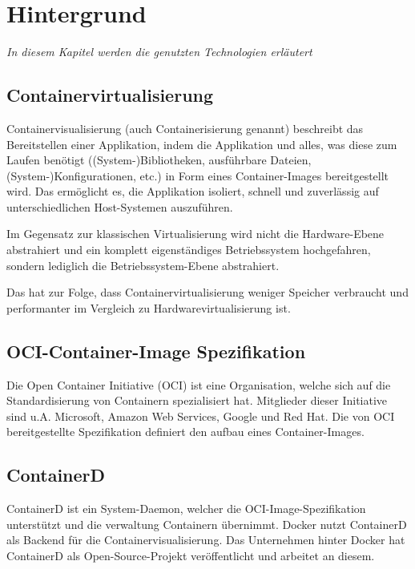 \chapter{Hintergrund}

\label{cha:background}
\textit{In diesem Kapitel werden die genutzten Technologien erläutert}

\section{Containervirtualisierung}

Containervisualisierung (auch Containerisierung genannt) beschreibt das Bereitstellen einer Applikation, indem die Applikation und alles, was diese zum Laufen benötigt ((System-)Bibliotheken, ausführbare Dateien, (System-)Konfigurationen, etc.) in Form eines Container-Images bereitgestellt wird. Das ermöglicht es, die Applikation isoliert, schnell und zuverlässig auf unterschiedlichen Host-Systemen auszuführen.

Im Gegensatz zur klassischen Virtualisierung wird nicht die Hardware-Ebene abstrahiert und ein komplett eigenständiges Betriebssystem hochgefahren, sondern lediglich die Betriebssystem-Ebene abstrahiert.

Das hat zur Folge, dass Containervirtualisierung weniger Speicher verbraucht und performanter im Vergleich zu Hardwarevirtualisierung ist.

\section{OCI-Container-Image Spezifikation}

Die Open Container Initiative (OCI) ist eine Organisation, welche sich auf die Standardisierung von Containern spezialisiert hat. Mitglieder dieser Initiative sind u.A. Microsoft, Amazon Web Services, Google und Red Hat. Die von OCI bereitgestellte Spezifikation definiert den aufbau eines Container-Images.

\section{ContainerD}

ContainerD ist ein System-Daemon, welcher die OCI-Image-Spezifikation unterstützt und die verwaltung Containern übernimmt. Docker nutzt ContainerD als Backend für die Containervisualisierung. Das Unternehmen hinter Docker hat ContainerD als Open-Source-Projekt veröffentlicht und arbeitet an diesem.

